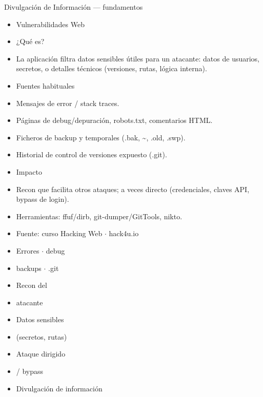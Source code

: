 \documentclass[aspectratio=169,10pt]{beamer}
\begin{document}
\begin{frame}[allowframebreaks]{Divulgación de Información --- fundamentos}
\small
  \begin{itemize}
  \item Vulnerabilidades Web
  \item ¿Qué es?
  \item La aplicación filtra datos sensibles útiles para un atacante: datos de usuarios, secretos, o detalles técnicos (versiones, rutas, lógica interna).
  \item Fuentes habituales
  \item Mensajes de error / stack traces.
  \item Páginas de debug/depuración, robots.txt, comentarios HTML.
  \item Ficheros de backup y temporales (.bak, \textasciitilde{}, .old, .swp).
  \item Historial de control de versiones expuesto (.git).
  \item Impacto
  \item Recon que facilita otros ataques; a veces directo (credenciales, claves API, bypass de login).
  \item Herramientas: ffuf/dirb, git-dumper/GitTools, nikto.
  \item Fuente: curso Hacking Web $\cdot$ hack4u.io
  \item Errores $\cdot$ debug
  \item backups $\cdot$ .git
  \item Recon del
  \item atacante
  \item Datos sensibles
  \item (secretos, rutas)
  \item Ataque dirigido
  \item / bypass
  \item Divulgación de información
  \end{itemize}
\end{frame}
\end{document}
